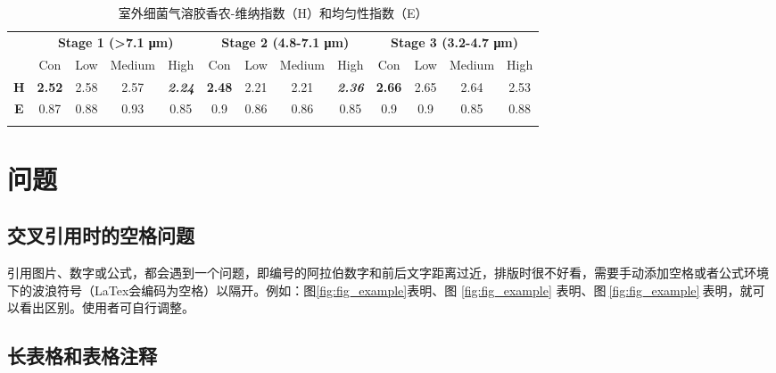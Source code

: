 \begin{table}[!htbp]
\centering
\caption{室外细菌气溶胶香农-维纳指数（H）和均匀性指数（E）\protect\footnotemark[1]}    %
\label{tab:table_example}
\renewcommand\arraystretch{1.6} %
\begin{tabular}{ccccccccccccc}  %
\Xhline{1.5pt}
\multirow{1}{*}{}   & \multicolumn{4}{c}{\textbf{Stage 1 (>7.1 μm)}}   & \multicolumn{4}{c}{\textbf{Stage 2 (4.8-7.1 μm)}} &  \multicolumn{4}{c}{\textbf{Stage 3 (3.2-4.7 μm)}}    \\  
\cline{2-13}
 &  Con &  Low &  Medium &  High &  Con &  Low &  Medium &  High &  Con &  Low &  Medium &  High  \\
 \hline
\textbf{H} &  \textbf{2.52} &  2.58 &  2.57 &  \textbf{\textit{2.24}} &  \textbf{2.48} &  2.21 &  2.21 &  \textbf{\textit{2.36}} &  \textbf{2.66} &  2.65 &  2.64 &  2.53 \\
\textbf{E} &  0.87 &  0.88 &  0.93 &  0.85 &  0.9 &  0.86 &  0.86 &  0.85 &  0.9 &  0.9 &  0.85 &  0.88 \\ 

\Xhline{1.5pt}
\end{tabular}
\end{table}


\section{问题}

\subsection{交叉引用时的空格问题}

引用图片、数字或公式，都会遇到一个问题，即编号的阿拉伯数字和前后文字距离过近，排版时很不好看，需要手动添加空格或者公式环境下的波浪符号（LaTex会编码为空格）以隔开。例如：图\ref{fig:fig_example}表明、图 \ref{fig:fig_example} 表明、图$~$\ref{fig:fig_example}$~$表明，就可以看出区别。使用者可自行调整。

\subsection{长表格和表格注释}

